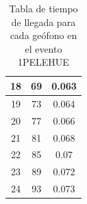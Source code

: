\documentclass{article}
\theoremstyle{mytheoremstyle}
\theoremstyle{mytheoremstyle}
\theoremstyle{myproblemstyle}
\begin{document}
\begin{table}[h!]
\begin{tabular}{|c|c|c|}
		18               & 69                         & 0.063                   \\ \hline
		19               & 73                         & 0.064                   \\ \hline
		20               & 77                         & 0.066                   \\ \hline
		21               & 81                         & 0.068                   \\ \hline
		22               & 85                         & 0.07                    \\ \hline
		23               & 89                         & 0.072                   \\ \hline
		24               & 93                         & 0.073                   \\ \hline
		\end{tabular}
		\caption{Tabla de tiempo de llegada para cada geófono en el evento 1PELEHUE}
		\end{table}
\end{document}
